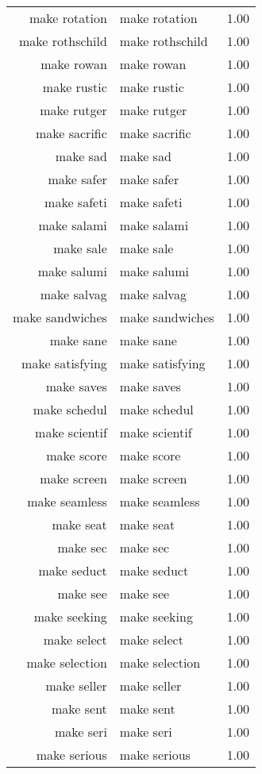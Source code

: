\begin{table}[ht]
\begin{tabular}{rlr}
  make rotation & make rotation & 1.00 \\ 
  make rothschild & make rothschild & 1.00 \\ 
  make rowan & make rowan & 1.00 \\ 
  make rustic & make rustic & 1.00 \\ 
  make rutger & make rutger & 1.00 \\ 
  make sacrific & make sacrific & 1.00 \\ 
  make sad & make sad & 1.00 \\ 
  make safer & make safer & 1.00 \\ 
  make safeti & make safeti & 1.00 \\ 
  make salami & make salami & 1.00 \\ 
  make sale & make sale & 1.00 \\ 
  make salumi & make salumi & 1.00 \\ 
  make salvag & make salvag & 1.00 \\ 
  make sandwiches & make sandwiches & 1.00 \\ 
  make sane & make sane & 1.00 \\ 
  make satisfying & make satisfying & 1.00 \\ 
  make saves & make saves & 1.00 \\ 
  make schedul & make schedul & 1.00 \\ 
  make scientif & make scientif & 1.00 \\ 
  make score & make score & 1.00 \\ 
  make screen & make screen & 1.00 \\ 
  make seamless & make seamless & 1.00 \\ 
  make seat & make seat & 1.00 \\ 
  make sec & make sec & 1.00 \\ 
  make seduct & make seduct & 1.00 \\ 
  make see & make see & 1.00 \\ 
  make seeking & make seeking & 1.00 \\ 
  make select & make select & 1.00 \\ 
  make selection & make selection & 1.00 \\ 
  make seller & make seller & 1.00 \\ 
  make sent & make sent & 1.00 \\ 
  make seri & make seri & 1.00 \\ 
  make serious & make serious & 1.00 \\ 

\end{tabular}
\end{table}
